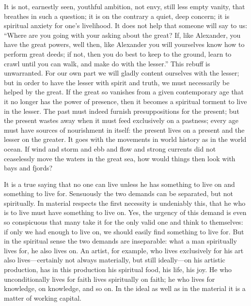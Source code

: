 \documentclass[12pt]{book}
\newcommand{\opage}[1]{\marginnote{\footnotesize\textit{[#1]}}}
\begin{document}
It is not, earnestly seen, youthful ambition, not envy, still less empty
vanity, that breathes in such a question; it is on the contrary a quiet,
deep concern; it is spiritual anxiety for one's livelihood. It does not
help that someone will say to us: ``Where are you going with your
asking about the great? If, like Alexander, you have the great powers,
well then, like Alexander you will yourselves know how to perform great
deeds; if not, then you do best to keep to the ground, learn to crawl
until you can walk, and make do with the lesser.'' This rebuff is
unwarranted. For our own part we will gladly content ourselves with the
lesser; but in order to have the lesser with spirit and truth, we must
necessarily be helped by the great. If the great so vanishes from a
given contemporary age that it no longer has the power of presence,
then it becomes a spiritual torment to live in the lesser. The past must
indeed furnish presuppositions for the present; but the present wastes
away when it must feed exclusively on a pastness; every age must have
sources of nourishment in itself: the present lives on a present and the
lesser on the greater. It goes with the movements in world history as
in the world ocean. If wind and storm and ebb and flow and strong
currents did not ceaselessly move the waters in the great sea, how would
things then look with bays and fjords?

It is a true saying that no one can live unless he has something to
live on and something to live for. Sensuously the two demands can be
separated, but not spiritually. In material respects the first necessity
is undeniably this, that he who is to live must have something
\opage{19}\setcounter{footnote}{0}%
to live on. Yes, the urgency of this demand is even so conspicuous that
many take it for the only valid one and think to themselves: if only we
had enough to live on, we should easily find something to live for. But
in the spiritual sense the two demands are inseparable: what a man
spiritually lives for, he also lives on. An artist, for example, who
lives exclusively for his art also lives---certainly not always
materially, but still ideally---on his artistic production, has in this
production his spiritual food, his life, his joy. He who unconditionally
lives for faith lives spiritually on faith; he who lives for knowledge,
on knowledge, and so on. In the ideal as well as in the material it is a
matter of working capital.
\end{document}
